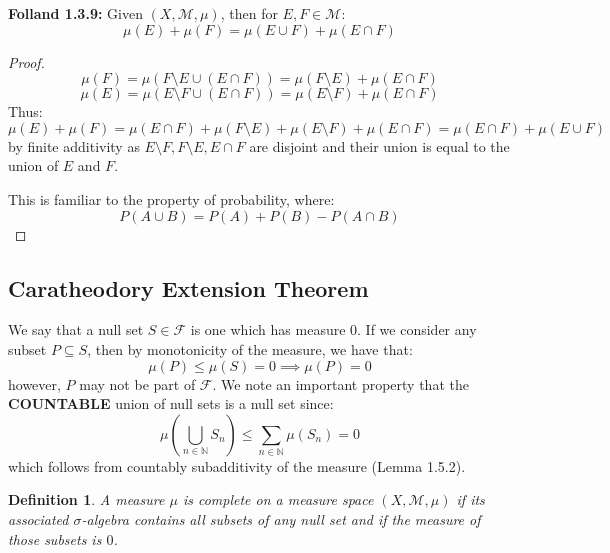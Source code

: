 \documentclass[10pt,letterpaper]{article} %
\newtheorem{defn}{Definition}[section]
\begin{document}
\textbf{Folland 1.3.9:} Given $(X, \mathcal{M}, \mu)$, then for $E, F \in \mathcal{M}$:
\begin{equation*}
\mu(E) + \mu(F) = \mu(E \cup F) + \mu(E \cap F)
\end{equation*}
\begin{proof}
\begin{equation*}
\mu(F) = \mu(F \setminus E \cup (E \cap F)) = \mu(F \setminus E) + \mu(E \cap F)
\end{equation*}
\begin{equation*}
\mu(E) = \mu(E \setminus F \cup (E \cap F)) = \mu(E \setminus F) + \mu(E \cap F)
\end{equation*}
Thus:
\begin{equation*}
\mu(E) + \mu(F) = \mu(E \cap F) + \mu(F \setminus E) + \mu(E \setminus F) + \mu(E \cap F) = \mu(E \cap F) + \mu(E \cup F)
\end{equation*}
by finite additivity as $E \setminus F, F \setminus E, E \cap F$ are disjoint and their union is equal to the union of $E$ and $F$.

This is familiar to the property of probability, where:
\begin{equation*}
P(A \cup B) = P(A) + P(B) - P(A \cap B)
\end{equation*}
\end{proof}

\pagebreak
\subsection{Caratheodory Extension Theorem}
We say that a null set $S \in \mathcal{F}$ is one which has measure $0$. If we consider any subset $P \subseteq S$, then by monotonicity of the measure, we have that:
\begin{equation*}
\mu(P) \leqslant \mu(S) = 0 \implies \mu(P) = 0
\end{equation*}
however, $P$ may not be part of $\mathcal{F}$. We note an important property that the \textbf{COUNTABLE} union of null sets is a null set since:
\begin{equation*}
\mu\left(\bigcup_{n \in \mathbb{N}}S_n\right) \leqslant \sum_{n \in \mathbb{N}}\mu(S_n) = 0
\end{equation*}
which follows from countably subadditivity of the measure (Lemma 1.5.2). 

\begin{defn}
A measure $\mu$ is complete on a measure space $(X, \mathcal{M}, \mu)$ if its associated $\sigma$-algebra contains all subsets of any null set and if the measure of those subsets is $0$.
\end{defn}
\end{document}

